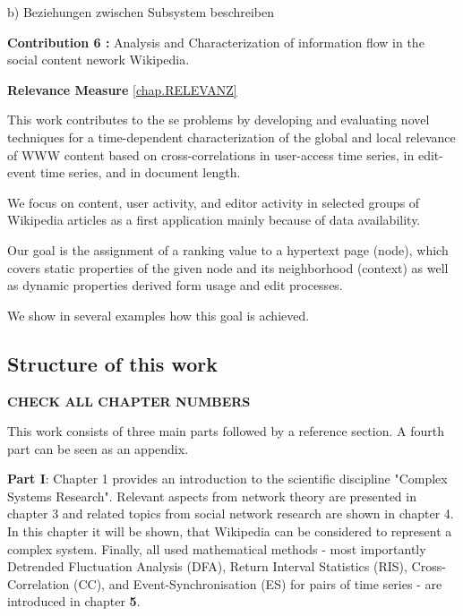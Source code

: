 \documentclass[a4paper,10pt]{scrbook}
\begin{document}
b) Beziehungen zwischen Subsystem beschreiben

\textbf{Contribution 6 :} Analysis and Characterization of information flow in the social content nework Wikipedia. 

\textbf{Relevance Measure}
\ref{chap.RELEVANZ}

This work contributes to the se problems by developing and evaluating 
novel techniques for a time-dependent characterization of the global and local 
relevance of WWW content based on cross-correlations in user-access time series, in 
edit-event time series, and in document length. 

We focus on content, user activity, 
and editor activity in selected groups of Wikipedia articles as a first application 
mainly because of data availability. 

Our goal is the assignment of a ranking value 
to a hypertext page (node), which covers static properties of the given node and its 
neighborhood (context) as well as dynamic properties derived form usage and edit 
processes. 

We show in several examples how this goal is achieved.


\subsection{Structure of this work}
\textbf{CHECK ALL CHAPTER NUMBERS}

This work consists of three main parts followed by a reference section. A fourth part can be seen as an appendix.  

\textbf{Part I}: Chapter 1 provides an introduction to the scientific discipline "Complex Systems Research". Relevant aspects from network theory are presented in chapter 3 and related topics from social network research are shown in chapter 4. In this chapter it will be shown, that Wikipedia can be considered to represent a complex system. Finally, all used mathematical methods - most importantly Detrended Fluctuation Analysis (DFA), Return Interval Statistics (RIS), Cross-Correlation (CC), and Event-Synchronisation (ES) for pairs of time series - are introduced in chapter \textbf{5}.
\end{document}
